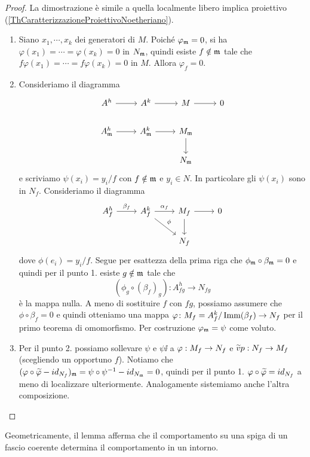 \begin{proof}
La dimostrazione è simile a quella localmente libero implica proiettivo (\ref{ThCaratterizzazioneProiettivoNoetheriano}).
\setlength{\leftmargini}{0cm}
\begin{enumerate}
\item Siano $x_1,\cdots,x_k$ dei generatori di $M$. Poiché $\varphi_{\mathfrak{m}}=0$, si ha $\varphi(x_1)=\cdots=\varphi(x_k)=0$ in $N_{\mathfrak{m}}$, quindi esiste $f\notin \mathfrak{m}$ tale che $f\varphi(x_1)=\cdots=f\varphi(x_k)=0$ in $M$. Allora $\varphi_f=0$. 
\item Consideriamo il diagramma %
\[\begin{tikzcd}
	{A^h} & {A^k} & M & 0 \\
	{A_\mf^h} & {A^k_\mf} & {M_\mf} \\
	&& {N_\mf}
	\arrow[from=1-1, to=1-2]
	\arrow[from=1-2, to=1-3]
	\arrow[from=1-3, to=1-4]
	\arrow[from=2-1, to=2-2]
	\arrow[from=2-2, to=2-3]
	\arrow[from=2-3, to=3-3]
\end{tikzcd}\]
e scriviamo $\psi(x_i)=y_i/f$ con $f\notin \mathfrak{m}$ e $y_i\in N$. In particolare gli $\psi(x_i)$ sono in $N_f$. Consideriamo il diagramma 
\[\begin{tikzcd}
	{A_f^h} & {A^k_f} & {M_f} & 0 \\
	&& {N_f}
	\arrow["{\beta_f}", from=1-1, to=1-2]
	\arrow["{\alpha_f}", from=1-2, to=1-3]
	\arrow["\phi", from=1-2, to=2-3]
	\arrow[from=1-3, to=1-4]
	\arrow[from=1-3, to=2-3]
\end{tikzcd}\]
dove $\phi(e_i)=y_i/f$. Segue per esattezza della prima riga che $\phi_{\mathfrak{m}}\circ \beta_{\mathfrak{m}}=0$ e quindi per il punto 1. esiste $g\notin \mathfrak{m}$ tale che \[(\phi_{g}\circ (\beta_{f})_g)\colon A_{fg}^h \to N_{fg}\] è la mappa nulla. A meno di sostituire $f$ con $fg$, possiamo assumere che $\phi\circ \beta_f=0$ e quindi otteniamo una mappa $\varphi\colon M_f=A^k_f/\operatorname{Imm}(\beta_f)\to N_f$ per il primo teorema di omomorfismo. Per costruzione $\varphi_{\mathfrak{m}}=\psi$ come voluto.
\item Per il punto 2. possiamo sollevare $\psi$ e $\psi\ii$ a $\varphi:M_f\to N_f$ e $\widetilde{v}p:N_f\to M_f$ (scegliendo un opportuno $f$). Notiamo che $(\varphi\circ \widetilde{\varphi}-id_{N_f})_{\mathfrak{m}}=\psi\circ \psi^{-1}-id_{N_{\mathfrak{m}}}=0$, quindi per il punto 1. $\varphi\circ \widetilde{\varphi}=id_{N_f}$ a meno di localizzare ulteriormente. Analogamente sistemiamo anche l'altra composizione.
\end{enumerate}
\setlength{\leftmargini}{0.5cm}  
\end{proof}
\begin{remark}
Geometricamente, il lemma afferma che il comportamento su una spiga di un fascio coerente determina il comportamento in un intorno.
\end{remark}



